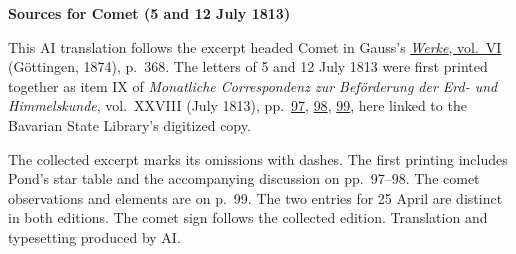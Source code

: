 \clearpage\thispagestyle{empty}
\begin{center}\textbf{Sources for Comet (5 and 12 July 1813)}\end{center}
\noindent This AI translation follows the excerpt headed Comet in Gauss’s \href{https://gdz.sub.uni-goettingen.de/id/PPN236007467}{\textit{Werke}, vol.~VI} (Göttingen, 1874), p.~368. The letters of 5 and 12 July 1813 were first printed together as item IX of \textit{Monatliche Correspondenz zur Beförderung der Erd- und Himmelskunde}, vol.~XXVIII (July 1813), pp.~\href{https://api.digitale-sammlungen.de/iiif/image/v2/bsb10538617_00103/full/1600,/0/default.jpg}{97}, \href{https://api.digitale-sammlungen.de/iiif/image/v2/bsb10538617_00104/full/1600,/0/default.jpg}{98}, \href{https://api.digitale-sammlungen.de/iiif/image/v2/bsb10538617_00105/full/1600,/0/default.jpg}{99}, here linked to the Bavarian State Library’s digitized copy.
\par\smallskip\noindent The collected excerpt marks its omissions with dashes. The first printing includes Pond’s star table and the accompanying discussion on pp.~97--98. The comet observations and elements are on p.~99. The two entries for 25 April are distinct in both editions. The comet sign follows the collected edition. Translation and typesetting produced by AI.
\clearpage
